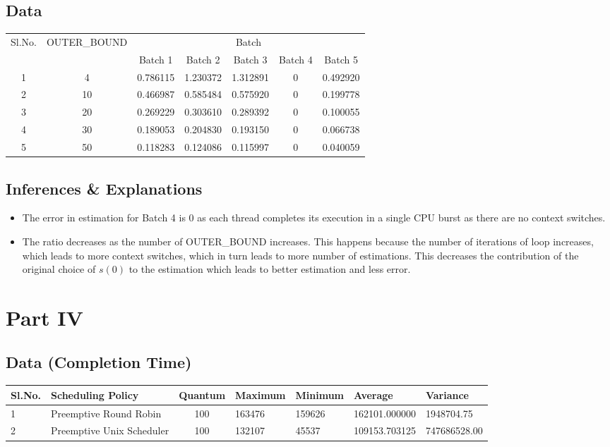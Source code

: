 \documentclass{article}
\begin{document}
\subsection{Data}
\begin{center}
    \begin{tabular}{| c | c | c | c | c | c | c |}
    \hline
    \multirow{2}{*}{Sl.No.} & \multirow{2}{*}{OUTER\_BOUND} & \multicolumn{5}{|c|}{Batch}\\ \cline{3-7}
    
     &  & Batch 1 & Batch 2 & Batch 3 & Batch 4 & Batch 5\\ \hline
     1 & 4 & 0.786115 & 1.230372 & 1.312891 & 0 & 0.492920 \\
     2 & 10 & 0.466987 & 0.585484 & 0.575920 & 0 & 0.199778\\
     3 & 20 & 0.269229 & 0.303610 & 0.289392 & 0 & 0.100055\\
     4 & 30 & 0.189053 & 0.204830 & 0.193150 & 0 & 0.066738\\
     5 & 50 & 0.118283 & 0.124086 & 0.115997 & 0 & 0.040059\\
    \hline
    \end{tabular}
\end{center}
\subsection{Inferences \& Explanations}
\begin{itemize}
  \item The error in estimation for Batch 4 is $0$ as each thread completes its execution in a single CPU burst as there are no context switches.
  \item The ratio decreases as the number of OUTER\_BOUND increases. This happens because the number of iterations of loop increases, which leads to more context switches, which in turn leads to more number of estimations. This decreases the contribution of the original choice of $s(0)$ to the estimation which leads to better estimation and less error.
\end{itemize}
\section{Part IV}
\subsection{Data (Completion Time)}
\begin{center}
    \begin{tabular}{| l | l | c | l | l | l | l |}
    \hline
    Sl.No. & Scheduling Policy & Quantum & Maximum & Minimum & Average & Variance \\ \hline
    1 & Preemptive Round Robin & 100 & 163476 & 159626 & 162101.000000 & 1948704.75\\
    2 & Preemptive Unix Scheduler & 100 & 132107 & 45537 & 109153.703125 & 747686528.00\\
    \hline
    \end{tabular}
\end{center}
\end{document}
